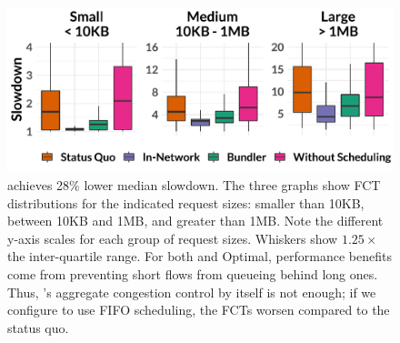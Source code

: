 \begin{figure}
    \centering
\begin{knitrout}
\color{fgcolor}
\includegraphics[width=\maxwidth]{figure/eval_best-1} 

\end{knitrout}
    \caption{\name achieves 28\% lower median slowdown. 
The three graphs show FCT distributions for the indicated request sizes: smaller than 10KB, between 10KB and 1MB, and greater than 1MB.  Note the different y-axis scales for each group of request sizes. Whiskers show $1.25 \times$ the inter-quartile range. 
For both \name and Optimal, performance benefits come from preventing short flows from queueing behind long ones. 
Thus, \name's aggregate congestion control by itself is not enough; if we configure \name to use FIFO scheduling, the FCTs worsen compared to the status quo.
    }\label{fig:eval:best}
\end{figure}
\newcommand{\overviewBenefitsBaselineMedian}{1.76\xspace}
\newcommand{\overviewBenefitsBaselineTail}{79.37\xspace}
\newcommand{\overviewBenefitsBundlerMedian}{1.26\xspace}
\newcommand{\overviewBenefitsBundlerTail}{41.38\xspace}
\newcommand{\overviewBenefitsOptimalMedian}{1.07\xspace}
\newcommand{\overviewBenefitsOptimalTail}{27.49\xspace}
\newcommand{\overviewBenefitsBundlerMedianImprovement}{28\%\xspace}
